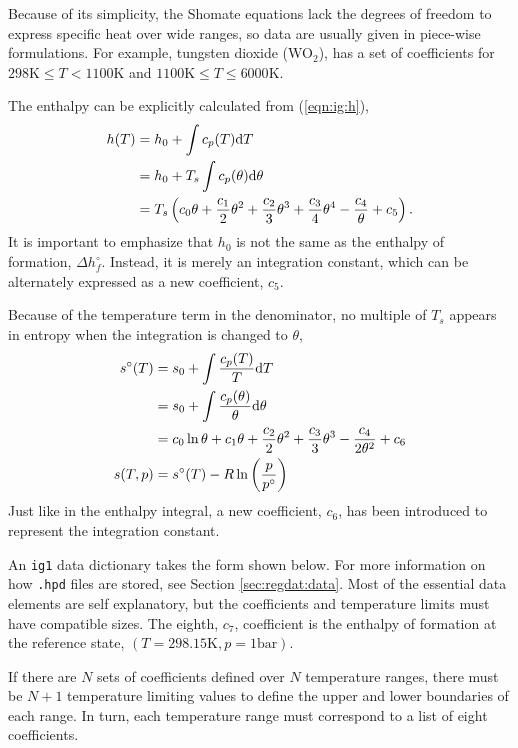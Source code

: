 Because of its simplicity, the Shomate equations lack the degrees of freedom to express specific heat over wide ranges, so data are usually given in piece-wise formulations.  For example, tungsten dioxide (WO$_2$), has a set of coefficients for $298\mathrm{K} \le T < 1100\mathrm{K}$ and $1100\mathrm{K} \le T \le 6000\mathrm{K}$.

The enthalpy can be explicitly calculated from (\ref{eqn:ig:h}),
\begin{align}
h(T) &= h_0 + \int c_p(T) \mathrm{d} T \nonumber\\
 &= h_0 + T_s \int c_p(\theta) \mathrm{d} \theta \nonumber\\
 &= T_s \left(c_0 \theta + \frac{c_1}{2} \theta^2 + \frac{c_2}{3} \theta^3 + \frac{c_3}{4} \theta^4 - \frac{c_4}{\theta} + c_5 \right).
\end{align}
It is important to emphasize that $h_0$ is not the same as the enthalpy of formation, $\Delta h^\circ_f$.  Instead, it is merely an integration constant, which can be alternately expressed as a new coefficient, $c_5$.

Because of the temperature term in the denominator, no multiple of $T_s$ appears in entropy when the integration is changed to $\theta$,
\begin{align}
s^\circ(T) &= s_0 + \int \frac{c_p(T)}{T}\mathrm{d} T\nonumber\\
 &= s_0 + \int \frac{c_p(\theta)}{\theta}\mathrm{d} \theta\nonumber\\
 &= c_0 \ln \theta + c_1 \theta + \frac{c_2}{2} \theta^2 + \frac{c_3}{3} \theta^3 -\frac{c_4}{2\theta^2} + c_6\\
s(T,p) &= s^\circ(T) - R \ln \left( \frac{p}{p^\circ} \right)\nonumber
\end{align}
Just like in the enthalpy integral, a new coefficient, $c_6$, has been introduced to represent the integration constant.

An \texttt{ig1} data dictionary takes the form shown below.  For more information on how \texttt{.hpd} files are stored, see Section \ref{sec:regdat:data}.  Most of the essential data elements are self explanatory, but the coefficients and temperature limits must have compatible sizes.  The eighth, $c_7$, coefficient is the enthalpy of formation at the reference state, $(T=298.15 \mathrm{K}, p=1 \mathrm{bar})$.  

If there are $N$ sets of coefficients defined over $N$ temperature ranges, there must be $N+1$ temperature limiting values to define the upper and lower boundaries of each range.  In turn, each temperature range must correspond to a list of eight coefficients.

